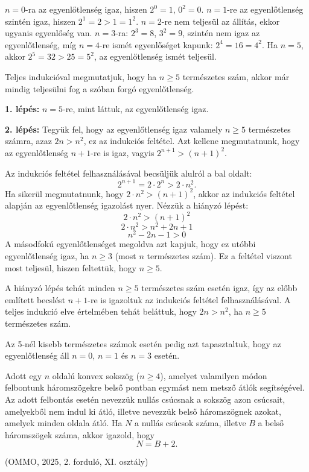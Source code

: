 \begin{solution}
$n=0$-ra az egyenlőtlenség igaz, hiszen $2^{0}=1$, $0^{2}=0$. $n=1$-re
az egyenlőtlenség szintén igaz, hiszen $2^{1}=2>1=1^{2}$. $n=2$-re
nem teljesül az állítás, ekkor ugyanis egyenlőség van. $n=3$-ra:
$2^{3}=8$, $3^{2}=9$, szintén nem igaz az egyenlőtlenség, míg $n=4$-re
ismét egyenlőséget kapunk: $2^{4}=16=4^{2}$. Ha $n=5$, akkor $2^{5}=32>25=5^{2}$,
az egyenlőtlenség ismét teljesül.

Teljes indukcióval megmutatjuk, hogy ha $n\geq5$ természetes szám,
akkor már mindig teljesülni fog a szóban forgó egyenlőtlenség.

\textbf{1. lépés:} $n=5$-re, mint láttuk, az egyenlőtlenség igaz.

\textbf{2. lépés:} Tegyük fel, hogy az egyenlőtlenség igaz valamely
$n\geq5$ természetes számra, azaz $2n>n^{2}$, ez az indukciós feltétel.
Azt kellene megmutatnunk, hogy az egyenlőtlenség $n+1$-re is igaz,
vagyis $2^{n+1}>(n+1)^{2}$.

Az indukciós feltétel felhasználásával becsüljük alulról a bal oldalt:
\[
2^{n+1}=2\cdot2^{n}>2\cdot n^{2}.
\]
Ha sikerül megmutatnunk, hogy $2\cdot n^{2}>(n+1)^{2}$, akkor az
indukciós feltétel alapján az egyenlőtlenség igazolást nyer. Nézzük
a hiányzó lépést: 
\[
2\cdot n^{2}>(n+1)^{2}
\]
\[
2\cdot n^{2}>n^{2}+2n+1
\]
\[
n^{2}-2n-1>0
\]
A másodfokú egyenlőtlenséget megoldva azt kapjuk, hogy ez utóbbi egyenlőtlenség
igaz, ha $n\geq3$ (most $n$ természetes szám). Ez a feltétel viszont
most teljesül, hiszen feltettük, hogy $n\geq5$.

A hiányzó lépés tehát minden $n\geq5$ természetes szám esetén igaz,
így az előbb említett becslést $n+1$-re is igazoltuk az indukciós
feltétel felhasználásával. A teljes indukció elve értelmében tehát
beláttuk, hogy $2n>n^{2}$, ha $n\geq5$ természetes szám.

Az 5-nél kisebb természetes számok esetén pedig azt tapasztaltuk,
hogy az egyenlőtlenség áll $n=0$, $n=1$ és $n=3$ esetén.
\end{solution}
\begin{extraproblem}
Adott egy $n$ oldalú konvex sokszög ($n\geq4$), amelyet valamilyen
módon felbontunk háromszögekre belső pontban egymást nem metsző átlók
segítségével. Az adott felbontás esetén nevezzük nullás csúcsnak a
sokszög azon csúcsait, amelyekből nem indul ki átló, illetve nevezzük
belső háromszögnek azokat, amelyek minden oldala átló. Ha $N$ a nullás
csúcsok száma, illetve $B$ a belső háromszögek száma, akkor igazold,
hogy 
\[
N=B+2.
\]
\begin{flushright}
(OMMO, 2025, 2. forduló, XI. osztály) 
\par\end{flushright}
\end{extraproblem}

